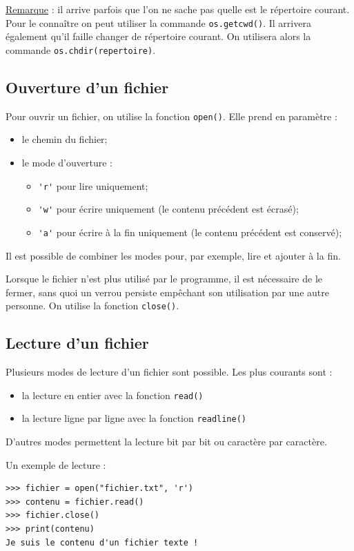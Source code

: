 \documentclass[12pt, a4paper]{article}
\begin{document}
\underline{Remarque} : il arrive parfois que l'on ne sache pas quelle est le répertoire courant. Pour le connaître on peut utiliser la commande \lstinline{os.getcwd()}. Il arrivera également qu'il faille changer de répertoire courant. On utilisera alors la commande \lstinline{os.chdir(repertoire)}.


\subsection{Ouverture d'un fichier}
Pour ouvrir un fichier, on utilise la fonction \lstinline{open()}. Elle prend en paramètre :
\begin{itemize}
	\item le chemin du fichier;
	\item le mode d'ouverture :
	\begin{itemize}
		\item \lstinline{'r'} pour lire uniquement;
		\item \lstinline{'w'} pour écrire uniquement (le contenu précédent est écrasé);
		\item \lstinline{'a'} pour écrire à la fin uniquement (le contenu précédent est conservé);
	\end{itemize}
\end{itemize}

Il est possible de combiner les modes pour, par exemple, lire et ajouter à la fin.

Lorsque le fichier n'est plus utilisé par le programme, il est nécessaire de le fermer, sans quoi un verrou persiste empêchant son utilisation par une autre personne. On utilise la fonction \lstinline{close()}.


\subsection{Lecture d'un fichier}
Plusieurs modes de lecture d'un fichier sont possible. Les plus courants sont :
\begin{itemize}
	\item la lecture en entier avec la fonction \lstinline{read()}
	\item la lecture ligne par ligne avec la fonction \lstinline{readline()}
\end{itemize}

D'autres modes permettent la lecture bit par bit ou caractère par caractère.

Un exemple de lecture :
\begin{lstlisting}
>>> fichier = open("fichier.txt", 'r')
>>> contenu = fichier.read()
>>> fichier.close()
>>> print(contenu)
Je suis le contenu d'un fichier texte !
\end{lstlisting}
\end{document}
